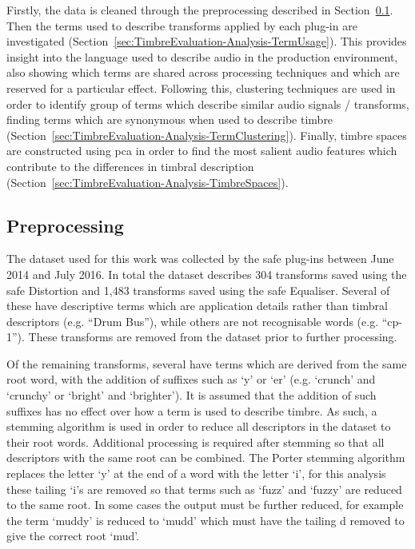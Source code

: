 	Firstly, the data is cleaned through the preprocessing described in
	Section~\ref{sec:TimbreEvaluation-Analysis-Preprocessing}. Then the terms used to describe transforms applied by
	each plug-in are investigated (Section~\ref{sec:TimbreEvaluation-Analysis-TermUsage}). This provides insight into
	the language used to describe audio in the production environment, also showing which terms are shared across
	processing techniques and which are reserved for a particular effect. Following this, clustering techniques are
	used in order to identify group of terms which describe similar audio signals / transforms, finding terms which are
	synonymous when used to describe timbre (Section~\ref{sec:TimbreEvaluation-Analysis-TermClustering}). Finally,
	timbre spaces are constructed using \acrshort{pca} in order to find the most salient audio features which
	contribute to the differences in timbral description (Section~\ref{sec:TimbreEvaluation-Analysis-TimbreSpaces}).

	\subsection{Preprocessing}
	\label{sec:TimbreEvaluation-Analysis-Preprocessing}
		The dataset used for this work was collected by the \acrshort{safe} plug-ins between June 2014 and July
		2016. In total the dataset describes 304 transforms saved using the \acrshort{safe} Distortion and 1,483
		transforms saved using the \acrshort{safe} Equaliser. Several of these have descriptive terms which are
		application details rather than timbral descriptors (e.g. ``Drum Bus''), while others are not recognisable
		words (e.g.  ``cp-1''). These transforms are removed from the dataset prior to further processing.

		Of the remaining transforms, several have terms which are derived from the same root word, with the
		addition of suffixes such as `y' or `er' (e.g. `crunch' and `crunchy' or `bright' and `brighter'). It is
		assumed that the addition of such suffixes has no effect over how a term is used to describe timbre. As
		such, a stemming algorithm \citep{porter1980an} is used in order to reduce all descriptors in the dataset
		to their root words.  Additional processing is required after stemming so that all descriptors with the
		same root can be combined.  The Porter stemming algorithm replaces the letter `y' at the end of a word with
		the letter `i', for this analysis these tailing `i's are removed so that terms such as `fuzz' and `fuzzy'
		are reduced to the same root. In some cases the output must be further reduced, for example the term
		`muddy' is reduced to `mudd' which must have the tailing d removed to give the correct root `mud'.


